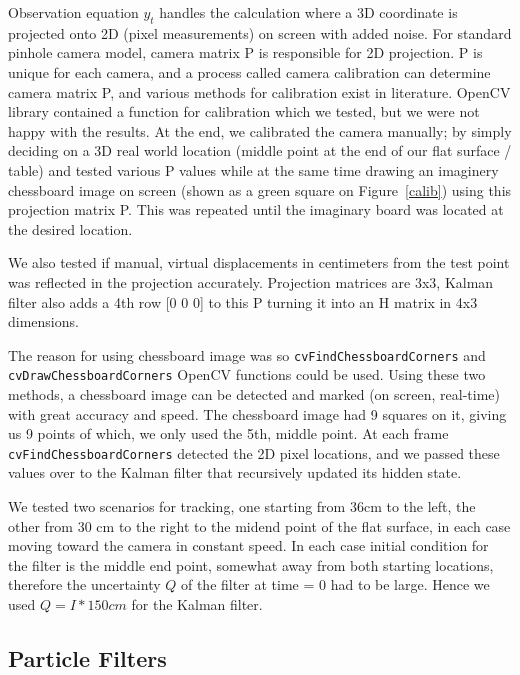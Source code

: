 Observation equation $y_t$ handles the calculation where a 3D coordinate is
projected onto 2D (pixel measurements) on screen with added noise. For standard
pinhole camera model, camera matrix P is responsible for 2D projection. P is
unique for each camera, and a process called camera calibration can determine
camera matrix P, and various methods for calibration exist in literature. OpenCV
library contained a function for calibration which we tested, but we were not
happy with the results. At the end, we calibrated the camera manually; by simply
deciding on a 3D real world location (middle point at the end of our flat
surface / table) and tested various P values while at the same time drawing an
imaginery chessboard image on screen (shown as a green square on
Figure~\ref{calib}) using this projection matrix P. This was repeated until the
imaginary board was located at the desired location.


We also tested if manual, virtual displacements in centimeters from the test
point was reflected in the projection accurately. Projection matrices are 3x3,
Kalman filter also adds a 4th row [0 0 0] to this P turning it into an H matrix
in 4x3 dimensions.

The reason for using chessboard image was so \verb!cvFindChessboardCorners!
and \verb!cvDrawChessboardCorners! OpenCV functions could be used. Using
these two methods, a chessboard image can be detected and marked (on
screen, real-time) with great accuracy and speed. The chessboard image had
9 squares on it, giving us 9 points of which, we only used the 5th, middle
point. At each frame \verb!cvFindChessboardCorners! detected the 2D pixel
locations, and we passed these values over to the Kalman filter that
recursively updated its hidden state.

We tested two scenarios for tracking, one starting from 36cm to the left, the
other from 30 cm to the right to the midend point of the flat surface, in each
case moving toward the camera in constant speed. In each case initial condition
for the filter is the middle end point, somewhat away from both starting
locations, therefore the uncertainty $Q$ of the filter at time = 0 had to be
large. Hence we used $Q = I*150cm$ for the Kalman filter. 

\subsection{Particle Filters}

